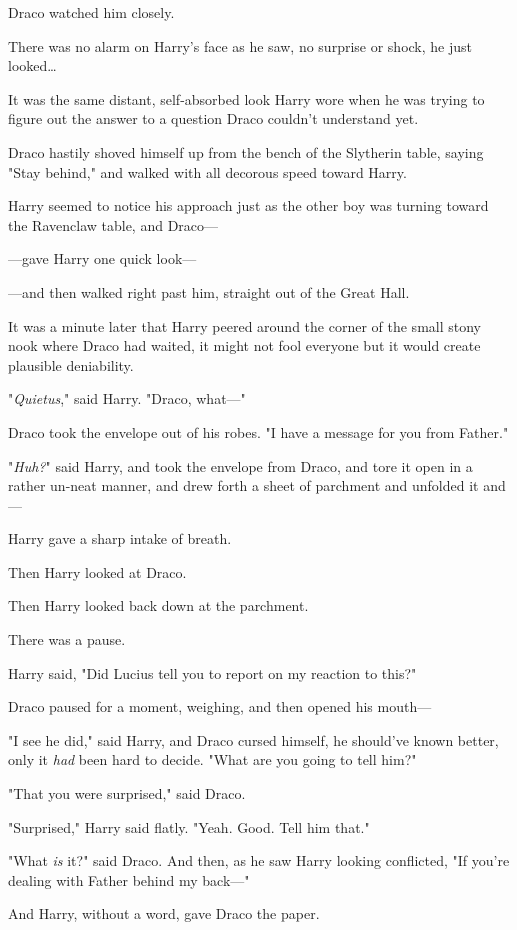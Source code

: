 Draco watched him closely.

There was no alarm on Harry's face as he saw, no surprise or shock, he just
looked…

It was the same distant, self-absorbed look Harry wore when he was trying to
figure out the answer to a question Draco couldn't understand yet.

Draco hastily shoved himself up from the bench of the Slytherin table, saying
"Stay behind," and walked with all decorous speed toward Harry.

Harry seemed to notice his approach just as the other boy was turning toward
the Ravenclaw table, and Draco—

—gave Harry one quick look—

—and then walked right past him, straight out of the Great Hall.

It was a minute later that Harry peered around the corner of the small stony
nook where Draco had waited, it might not fool everyone but it would create
plausible deniability.

"\emph{Quietus}," said Harry. "Draco, what—"

Draco took the envelope out of his robes. "I have a message for you from
Father."

"\emph{Huh?}" said Harry, and took the envelope from Draco, and tore it open in
a rather un-neat manner, and drew forth a sheet of parchment and unfolded it
and—

Harry gave a sharp intake of breath.

Then Harry looked at Draco.

Then Harry looked back down at the parchment.

There was a pause.

Harry said, "Did Lucius tell you to report on my reaction to this?"

Draco paused for a moment, weighing, and then opened his mouth—

"I see he did," said Harry, and Draco cursed himself, he should've known
better, only it \emph{had} been hard to decide. "What are you going to tell
him?"

"That you were surprised," said Draco.

"Surprised," Harry said flatly. "Yeah. Good. Tell him that."

"What \emph{is} it?" said Draco. And then, as he saw Harry looking conflicted,
"If you're dealing with Father behind my back—"

And Harry, without a word, gave Draco the paper.

